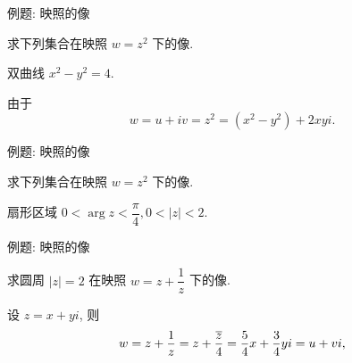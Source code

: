 \begin{frame}{例题: 映照的像}
\onslide<+->
\begin{example}
求下列集合在映照 $w=z^2$ 下的像.

 双曲线 $x^2-y^2=4$.
\end{example}
\onslide<+->
\begin{solution}
\indent
由于 \[w=u+iv=z^2=(x^2-y^2)+2xyi.\]

\indent
{}
\end{solution}
\end{frame}


\begin{frame}{例题: 映照的像}
\onslide<+->
\begin{example}
求下列集合在映照 $w=z^2$ 下的像.

 扇形区域 $0<\arg z<\dfrac\pi4,0<|z|<2$.
\end{example}
\onslide<+->
\begin{solution}
\end{solution}
\end{frame}


\begin{frame}{例题: 映照的像}
\onslide<+->
\begin{example}
求圆周 $|z|=2$ 在映照 $w=z+\dfrac1z$ 下的像.
\end{example}
\onslide<+->
\begin{solution}
设 $z=x+yi$, 则
\[w=z+\frac1z=z+\frac{\overline z}4=\frac54x+\frac34yi=u+vi,\]
\vspace{-0.2\baselineskip}
\onslide<+->{
\[x=\frac45u,\quad y=\frac43v,\quad \left(\frac45u\right)^2+\left(\frac43v\right)^2=4,\]}
\vspace{-0.2\baselineskip}
\onslide<+->{
\[\left(\frac{2u}5\right)^2+\left(\frac{2v}3\right)^2=1.\]}
\vspace{-0.2\baselineskip}
\end{solution}
\end{frame}

